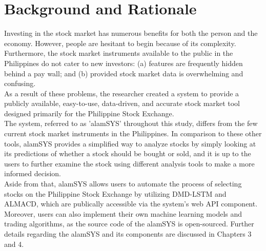 \section{Background and Rationale}
\label{sec:background}
Investing in the stock market has numerous benefits for both the person and the economy. 
However, people are hesitant to begin because of its complexity. Furthermore, the stock market instruments 
available to the public in the Philippines do not cater to new investors: (a) features are frequently hidden 
behind a pay wall; and (b) provided stock market data is overwhelming and confusing.
\\

As a result of these problems, the researcher created a system to provide a publicly available, easy-to-use, 
data-driven, and accurate stock market tool designed primarily for the Philippine Stock Exchange.
\\

The system, referred to as 'alamSYS' throughout this study, differs from the few current stock market 
instruments in the Philippines. In comparison to these other tools, alamSYS provides a simplified way 
to analyze stocks by simply looking at its predictions of whether a stock should be bought or sold, and 
it is up to the users to further examine the stock using different analysis tools to make a more 
informed decision.
\\

Aside from that, alamSYS allows users to automate the process of selecting stocks on the Philippine Stock 
Exchange by utilizing DMD-LSTM and ALMACD, which are publically accessible via the system's web API component. 
Moreover, users can also implement their own machine learning models and trading algorithms, as the
source code of the alamSYS is open-sourced. Further details regarding the alamSYS and its components are discussed
in Chapters 3 and 4.
\\